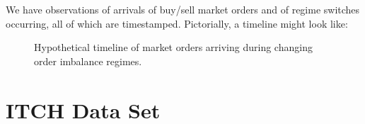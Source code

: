 We have observations of arrivals of buy/sell market orders and of regime switches occurring, all of which are timestamped. Pictorially, a timeline might look like:
\begin{figure}[H]
  
\caption{Hypothetical timeline of market orders arriving during changing order imbalance regimes.}
\label{introtimeline}
\end{figure}

\section{ITCH Data Set}
